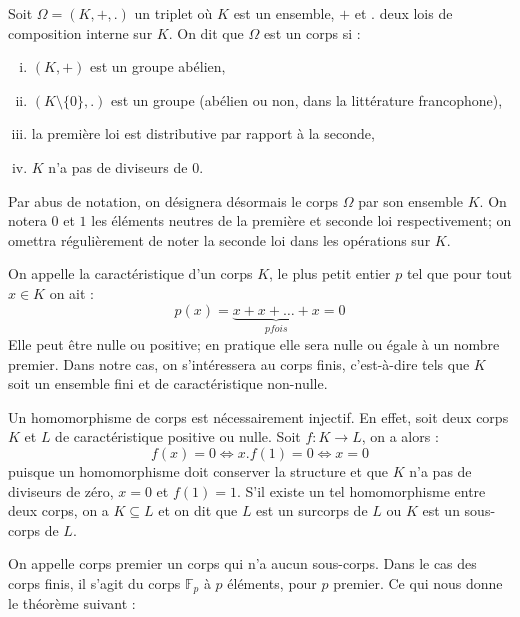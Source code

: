 \documentclass[a4paper]{article} %
\numberwithin{section}{part}
\numberwithin{equation}{section}
\newcommand\GF[1]{\mathbb{F}_{#1}}
\begin{document}
Soit $\Omega = (K, +, .)$ un triplet où $K$ est un ensemble, $+$ et $.$ deux
lois de composition interne sur $K$. On dit que $\Omega$ est un corps si : 
\begin{enumerate}[(i)]
\item $(K, +)$ est un groupe abélien,
\item $(K\setminus\lbrace0\rbrace,.)$ est un groupe (abélien ou non, dans la 
littérature francophone),
\item la première loi est distributive par rapport à la seconde,
\item $K$ n'a pas de diviseurs de $0$.
\end{enumerate}
Par abus de notation, on désignera désormais le corps $\Omega$ par son ensemble
$K$. On notera $0$ et $1$ les éléments neutres de la première et seconde loi 
respectivement; on omettra régulièrement de noter la seconde loi dans les 
opérations sur $K$.\par
On appelle la caractéristique d'un corps $K$, le plus petit entier $p$ tel que 
pour tout $x\in K$ on ait :
\[p(x) = \underbrace{x + x + \dots + x}_{p fois} = 0\]
Elle peut être nulle ou positive; en pratique elle sera nulle ou égale à un
nombre premier. Dans notre cas, on s'intéressera au corps finis, c'est-à-dire 
tels que $K$ soit un ensemble fini et de caractéristique non-nulle.\par
\vspace{0.3cm}
Un homomorphisme de corps est nécessairement injectif. En effet, soit deux corps
$K$ et $L$ de caractéristique positive ou nulle. Soit $f : K \to L$, on a 
alors :
\[f(x) = 0 \Leftrightarrow x.f(1) = 0 \Leftrightarrow x = 0\]
puisque un homomorphisme doit conserver la structure et que $K$ n'a pas de
diviseurs de zéro, $x = 0$ et $f(1) = 1$. S'il existe un
tel homomorphisme entre deux corps, on a $K\subseteq L$ et on dit que $L$ est un
surcorps de $L$ ou $K$ est un sous-corps de $L$.\par
On appelle corps premier un corps qui n'a aucun sous-corps. Dans le cas des
corps finis, il s'agit du corps $\GF{p}$ à $p$ éléments, pour $p$ premier. Ce
qui nous donne le théorème suivant :
\end{document}
